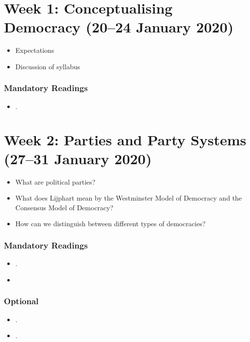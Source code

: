 \documentclass[abstract=on,parskip=full,headings=standardclasses,fontsize=11pt,paper=a4]{scrartcl}
\begin{document}
\newpage

\tableofcontents

\section{Week 1: Conceptualising Democracy (20--24 January 2020)}

\begin{itemize}
\renewcommand\labelitemi{--}
\item Expectations
\item Discussion of syllabus
\end{itemize}


\subsubsection*{Mandatory Readings}
\begin{itemize}
\item {}.
\end{itemize}


\section{Week 2: Parties and Party Systems (27--31 January 2020)}

\begin{itemize}
\renewcommand\labelitemi{--}
\item  What are political parties?
\item What does Lijphart mean by the Westminster Model of Democracy and the Consensus Model of Democracy?
\item How can we distinguish between different types of democracies?
\end{itemize}

\subsubsection*{Mandatory Readings}
\begin{itemize}
\item {}.
\item {}
\end{itemize}



\subsubsection*{Optional}
\begin{itemize}
\item {}.
\item {}.
\end{itemize}
\end{document}
